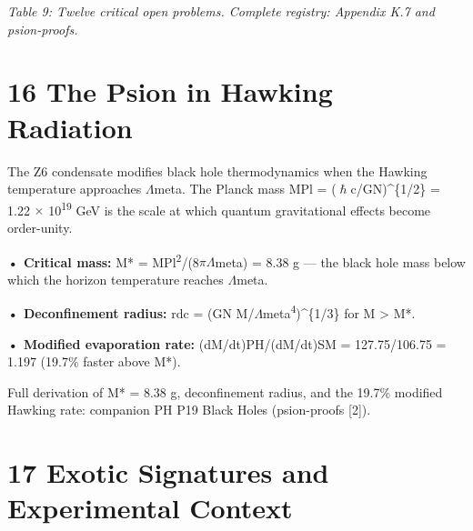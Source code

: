 \documentclass[11pt,letterpaper]{article}
\begin{document}
\begin{footnotesize}
\end{footnotesize}

\begingroup\centering\footnotesize\itshape Table 9: Twelve critical open problems. Complete registry: Appendix K.7 and psion-proofs.\par\endgroup

\section*{16  The Psion in Hawking Radiation}

\noindent The Z6 condensate modifies black hole thermodynamics when the Hawking temperature approaches $\Lambda$meta. The Planck mass MPl = ($\hslash$c/GN)\textasciicircum{}\{1/2\} = 1.22 $\times$ 10\textsuperscript{19} GeV is the scale at which quantum gravitational effects become order-unity.

\noindent \textbf{• Critical mass: }M* = MPl\textsuperscript{2}/(8$\pi$$\Lambda$meta) = 8.38 g --- the black hole mass below which the horizon temperature reaches $\Lambda$meta.

\noindent \textbf{• Deconfinement radius: }rdc = (GN M/$\Lambda$meta\textsuperscript{4})\textasciicircum{}\{1/3\} for M > M*.

\noindent \textbf{• Modified evaporation rate: }(dM/dt)PH/(dM/dt)SM = 127.75/106.75 = 1.197 (19.7\% faster above M*).

\noindent Full derivation of M* = 8.38 g, deconfinement radius, and the 19.7\% modified Hawking rate: companion PH P19 Black Holes (psion-proofs [2]).

\section*{17  Exotic Signatures and Experimental Context}
\end{document}
